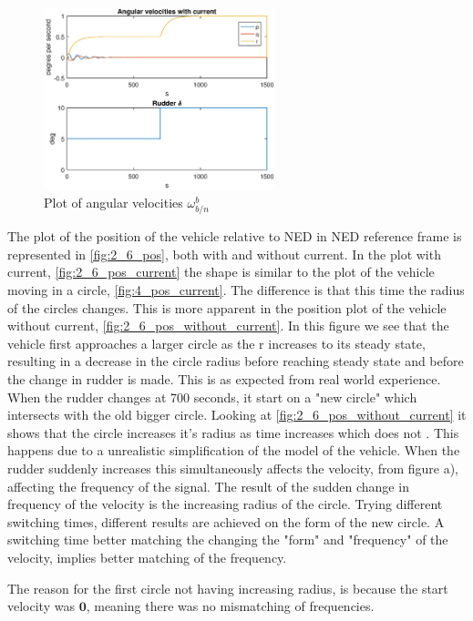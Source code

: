 \begin{figure}[!ht]
	\centering
	\includegraphics[width=0.6\textwidth]{figures/2_6_ang_vel.eps}
	\caption{Plot of angular velocities $\omega^b_{b/n}$}
	\label{fig:2_6_ang_vel}
\end{figure}

The plot of the position of the vehicle relative to NED in NED reference frame is represented in \ref{fig:2_6_pos}, both with and without current. In the plot with current,  \ref{fig:2_6_pos_current} the shape is similar to the plot of the vehicle moving in a circle, \ref{fig:4_pos_current}. The difference is that this time the radius of the circles changes. This is more apparent in the position plot of the vehicle without current,  \ref{fig:2_6_pos_without_current}. In this figure we see that the vehicle first approaches a larger circle as the r increases to its steady state, resulting in a decrease in the circle radius before reaching steady state and before the change in rudder is made. This is as expected from real world experience. When the rudder changes at 700 seconds, it start on a "new circle" which intersects with the old bigger circle. Looking at \ref{fig:2_6_pos_without_current} it shows that the circle increases it's radius as time increases which does not . This happens due to a unrealistic simplification of the model of the vehicle. When the rudder suddenly increases this simultaneously affects the velocity, from figure  a), affecting the frequency of the signal. The result of the sudden change in frequency of the velocity is the increasing radius of the circle. Trying different switching times, different results are achieved on the form of the new circle. A switching time better matching the changing the "form" and "frequency" of the velocity, implies better matching of the frequency.  

The reason for the first circle not having increasing radius, is because the start velocity was $\mathbf{0}$, meaning there was no mismatching of frequencies.  


